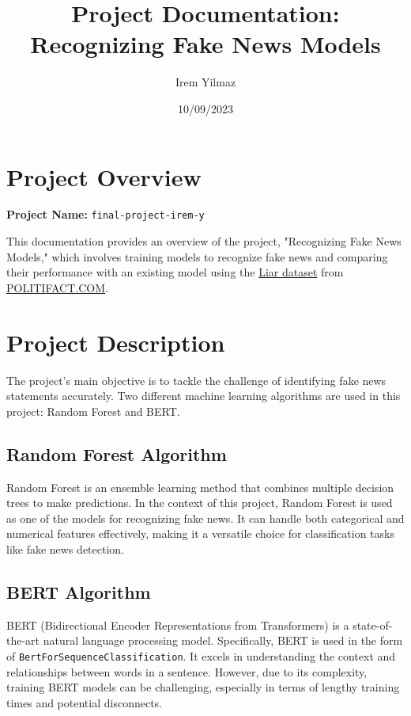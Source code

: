 \documentclass{article}
\begin{document}
\title{Project Documentation: Recognizing Fake News Models}
\author{Irem Yilmaz}
\date{10/09/2023}
\maketitle

\section*{Project Overview}
\textbf{Project Name:} \texttt{final-project-irem-y}

This documentation provides an overview of the project, "Recognizing Fake News Models," which involves training models to recognize fake news and comparing their performance with an existing model using the \href{https://huggingface.co/datasets/liar}{Liar dataset} from \href{https://www.politifact.com/}{POLITIFACT.COM}.

\section*{Project Description}
The project's main objective is to tackle the challenge of identifying fake news statements accurately. Two different machine learning algorithms are used in this project: Random Forest and BERT.

\subsection*{Random Forest Algorithm}
Random Forest is an ensemble learning method that combines multiple decision trees to make predictions. In the context of this project, Random Forest is used as one of the models for recognizing fake news. It can handle both categorical and numerical features effectively, making it a versatile choice for classification tasks like fake news detection.

\subsection*{BERT Algorithm}
BERT (Bidirectional Encoder Representations from Transformers) is a state-of-the-art natural language processing model. Specifically, BERT is used in the form of \texttt{BertForSequenceClassification}. It excels in understanding the context and relationships between words in a sentence. However, due to its complexity, training BERT models can be challenging, especially in terms of lengthy training times and potential disconnects.
\end{document}
